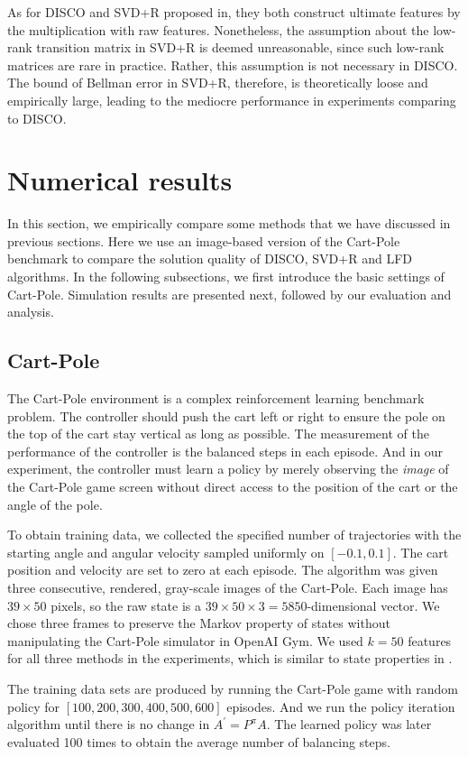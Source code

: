 \documentclass[onecolumn, conference]{IEEEtran}
\begin{document}
As for DISCO and SVD+R proposed in\cite{Behzadian2019FeatureSB}, they both construct ultimate features by the multiplication with raw features. Nonetheless, the assumption about the low-rank transition matrix in SVD+R is deemed unreasonable, since such low-rank matrices are rare in practice. Rather, this assumption is not necessary in DISCO. The bound of Bellman error in SVD+R, therefore, is theoretically loose and empirically large, leading to the mediocre performance in experiments comparing to DISCO.


\section{Numerical results}\label{sec:simulation}
In this section, we empirically compare some methods that we have discussed in previous sections. Here we use an image-based version of the Cart-Pole benchmark to compare the solution quality of DISCO, SVD+R and LFD algorithms. In the following subsections, we first introduce the basic settings of Cart-Pole. Simulation results are presented next, followed by our evaluation and analysis.
\subsection{Cart-Pole}
The Cart-Pole environment is a complex reinforcement learning benchmark problem. The controller should push the cart left or right to 
ensure the pole on the top of the cart stay vertical as long as possible. The measurement of the performance of the controller is 
the balanced steps in each episode. 
And in our experiment, the controller must learn a policy by merely observing the \textit{image} of the Cart-Pole game 
screen without direct access to the position of the cart or the angle of the pole. 

To obtain training data, we collected the specified number of trajectories with the starting angle and angular velocity 
sampled uniformly on $[-0.1,0.1]$. The cart position and velocity are set to zero at each episode. The algorithm was
given three consecutive, rendered, gray-scale images of the Cart-Pole. Each image has $39\times50$ pixels, so the raw state is a $39\times 50\times 3 = 5850$-dimensional vector. We chose three frames to preserve the Markov property of states without manipulating the Cart-Pole simulator in OpenAI Gym. We used $k = 50$ features for all three methods in the experiments, which is similar to
state properties in \cite{Song2016LinearFE}. 

The training data sets are produced by running the Cart-Pole game with random policy for $[100, 200, 300, 400, 500, 600]$ episodes. And we run the policy iteration algorithm until there is no change in $A^{\prime}=P^{\pi}A$. The learned policy was later evaluated 100 times to obtain the average number of balancing steps. 
\end{document}
